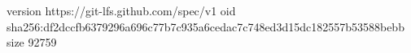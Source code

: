 version https://git-lfs.github.com/spec/v1
oid sha256:df2dccfb6379296a696c77b7c935a6cedac7c748ed3d15dc182557b53588bebb
size 92759
